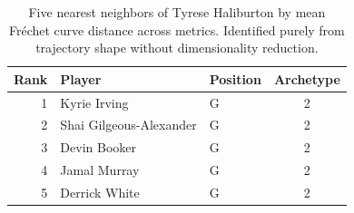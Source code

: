 \begin{table}[htbp]
  \centering\small
  \begin{tabular}{rllc}
    \toprule
    Rank & Player & Position & Archetype \\
    \midrule
    1 & Kyrie Irving & G & 2 \\
    2 & Shai Gilgeous-Alexander & G & 2 \\
    3 & Devin Booker & G & 2 \\
    4 & Jamal Murray & G & 2 \\
    5 & Derrick White & G & 2 \\
    \bottomrule
  \end{tabular}
  \caption{Five nearest neighbors of Tyrese Haliburton by mean Fr\'{e}chet curve distance across metrics. Identified purely from trajectory shape without dimensionality reduction.}
  \label{tab:Tyrese_Haliburton_frechet_curve_neighbors}
\end{table}


